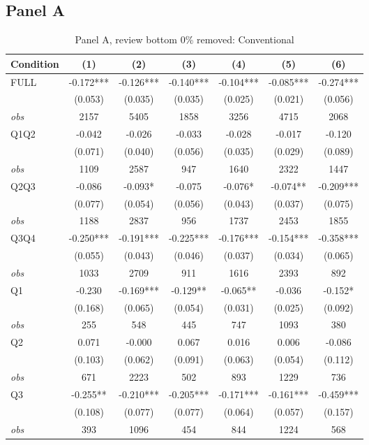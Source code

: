 \subsection{Panel A}
\begin{table}[!htbp]
\centering
\caption{Panel A, review bottom 0\% removed: Conventional}
\begin{tabular}{lcccccc}
\toprule
Condition & (1) & (2) & (3) & (4) & (5) & (6) \\
\midrule
FULL & -0.172*** & -0.126*** & -0.140*** & -0.104*** & -0.085*** & -0.274*** \\
 & (0.053) & (0.035) & (0.035) & (0.025) & (0.021) & (0.056) \\
\textit{obs} & 2157 & 5405 & 1858 & 3256 & 4715 & 2068 \\
Q1Q2 & -0.042 & -0.026 & -0.033 & -0.028 & -0.017 & -0.120 \\
 & (0.071) & (0.040) & (0.056) & (0.035) & (0.029) & (0.089) \\
\textit{obs} & 1109 & 2587 & 947 & 1640 & 2322 & 1447 \\
Q2Q3 & -0.086 & -0.093* & -0.075 & -0.076* & -0.074** & -0.209*** \\
 & (0.077) & (0.054) & (0.056) & (0.043) & (0.037) & (0.075) \\
\textit{obs} & 1188 & 2837 & 956 & 1737 & 2453 & 1855 \\
Q3Q4 & -0.250*** & -0.191*** & -0.225*** & -0.176*** & -0.154*** & -0.358*** \\
 & (0.055) & (0.043) & (0.046) & (0.037) & (0.034) & (0.065) \\
\textit{obs} & 1033 & 2709 & 911 & 1616 & 2393 & 892 \\
Q1 & -0.230 & -0.169*** & -0.129** & -0.065** & -0.036 & -0.152* \\
 & (0.168) & (0.065) & (0.054) & (0.031) & (0.025) & (0.092) \\
\textit{obs} & 255 & 548 & 445 & 747 & 1093 & 380 \\
Q2 & 0.071 & -0.000 & 0.067 & 0.016 & 0.006 & -0.086 \\
 & (0.103) & (0.062) & (0.091) & (0.063) & (0.054) & (0.112) \\
\textit{obs} & 671 & 2223 & 502 & 893 & 1229 & 736 \\
Q3 & -0.255** & -0.210*** & -0.205*** & -0.171*** & -0.161*** & -0.459*** \\
 & (0.108) & (0.077) & (0.077) & (0.064) & (0.057) & (0.157) \\
\textit{obs} & 393 & 1096 & 454 & 844 & 1224 & 568 \\

\end{tabular}
\end{table}
